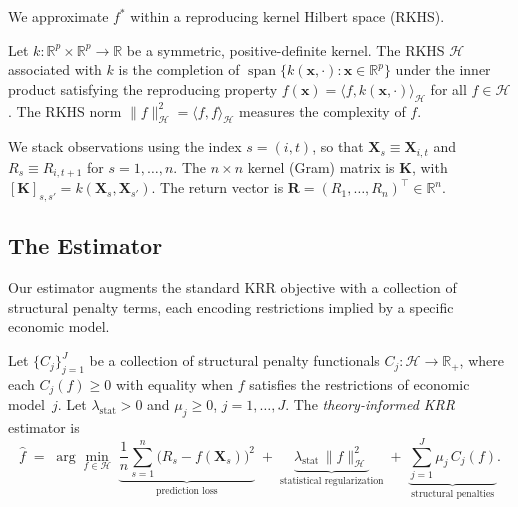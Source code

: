 We approximate $f^{*}$ within a reproducing kernel Hilbert space (RKHS).

\begin{definition}[RKHS]
\label{def:rkhs}
Let $k: \mathbb{R}^p \times \mathbb{R}^p \to \mathbb{R}$ be a symmetric,
positive-definite kernel.
The RKHS $\mathcal{H}$ associated with $k$ is the completion of
$\operatorname{span}\{k(\mathbf{x}, \cdot) : \mathbf{x} \in \mathbb{R}^p\}$
under the inner product satisfying the reproducing property
$f(\mathbf{x}) = \langle f, k(\mathbf{x}, \cdot) \rangle_{\mathcal{H}}$
for all $f \in \mathcal{H}$.
The RKHS norm $\|f\|_{\mathcal{H}}^2 = \langle f, f \rangle_{\mathcal{H}}$
measures the complexity of $f$.
\end{definition}

We stack observations using the index $s = (i,t)$, so that
$\mathbf{X}_s \equiv \mathbf{X}_{i,t}$ and $R_s \equiv R_{i,t+1}$ for
$s = 1, \ldots, n$.
The $n \times n$ kernel (Gram) matrix is
$\mathbf{K}$, with $[\mathbf{K}]_{s,s'} = k(\mathbf{X}_s, \mathbf{X}_{s'})$.
The return vector is $\mathbf{R} = (R_1, \ldots, R_n)^\top \in \mathbb{R}^n$.

\subsection{The Estimator}
\label{sub:estimator}

Our estimator augments the standard KRR objective with a collection of
structural penalty terms, each encoding restrictions implied by a specific
economic model.

\begin{definition}
\label{def:tikrr}
Let $\{C_j\}_{j=1}^{J}$ be a collection of structural penalty functionals
$C_j: \mathcal{H} \to \mathbb{R}_+$,
where each $C_j(f) \geq 0$ with equality when $f$ satisfies the
restrictions of economic model~$j$.
Let $\lambda_{\mathrm{stat}} > 0$ and $\mu_j \geq 0$, $j = 1, \ldots, J$.
The \emph{theory-informed KRR} estimator is
\begin{equation}
\label{eq:tikrr}
\hat{f} \;=\; \arg\min_{f \in \mathcal{H}} \;
\underbrace{\frac{1}{n}\sum_{s=1}^{n}
  \bigl(R_s - f(\mathbf{X}_s)\bigr)^2}_{\text{prediction loss}}
\;+\;
\underbrace{\lambda_{\mathrm{stat}}\,\|f\|_{\mathcal{H}}^2}_{\text{statistical regularization}}
\;+\;
\underbrace{\sum_{j=1}^{J} \mu_j\, C_j(f)}_{\text{structural penalties}}.
\end{equation}
\end{definition}

